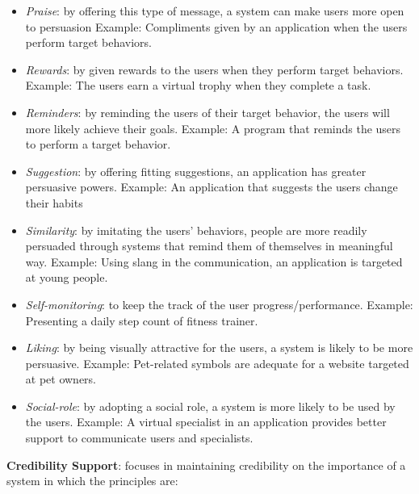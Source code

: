 \begin{itemize}
\item \emph{Praise}: by offering this type of message, a system can make users more open to persuasion
Example: Compliments given by an application when the users perform target behaviors.
\item \emph{Rewards}: by given rewards to the users when they perform target behaviors.
Example: The users earn a virtual trophy when they complete a task.
\item \emph{Reminders}: by reminding the users of their target behavior, the users will more likely achieve their goals.
Example: A program that reminds the users to perform a target behavior.
\item \emph{Suggestion}: by offering fitting suggestions, an application has greater persuasive powers.
Example: An application that suggests the users change their habits
\item \emph{Similarity}: by imitating the users' behaviors,  people are more readily persuaded through systems that remind them of themselves in meaningful way.
Example: Using slang in the communication, an application is targeted at young people.
\item \emph{Self-monitoring}: to keep the track of the user progress/performance.
Example: Presenting a daily step count of fitness trainer.
\item \emph{Liking}: by being visually attractive for the users, a system is likely to be more persuasive.
Example: Pet-related symbols are adequate for a website targeted at pet owners.
\item \emph{Social-role}: by adopting a social role, a system is more likely to be used by the users.
Example: A virtual specialist in an application provides better support to communicate users and specialists.
\end{itemize}

\textbf{Credibility Support}: focuses in maintaining credibility on the importance of a system in which the principles are:

